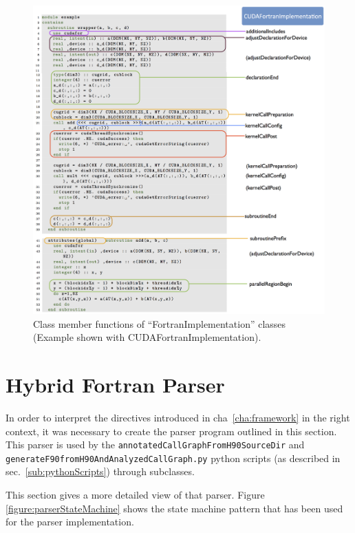 \begin{figure}[htpb]
	\centering
	\includegraphics[width=12cm]{figures/implementationMap}
	\caption[Switching Fortran Implementations]{Class member functions of ``FortranImplementation'' classes (Example shown with CUDAFortranImplementation).}
	\label{figure:implementationMap}
\end{figure}
\clearpage

\section{Hybrid Fortran Parser} \label{sub:parser}

In order to interpret the directives introduced in cha~\ref{cha:framework} in the right context, it was necessary to create the parser program outlined in this section. This parser is used by the \verb|annotatedCallGraphFromH90SourceDir| and \linebreak \verb|generateF90fromH90AndAnalyzedCallGraph.py| python scripts (as described in sec.~\ref{sub:pythonScripts}) through subclasses.

This section gives a more detailed view of that parser. Figure \ref{figure:parserStateMachine} shows the state machine pattern that has been used for the parser implementation.

